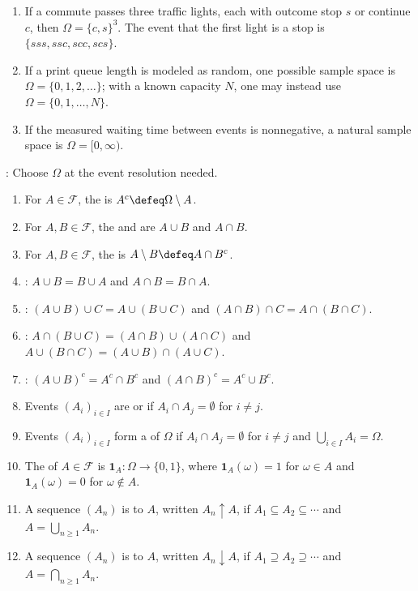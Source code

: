 \begin{example} \label{ex:introductory-sample-spaces-and-events} 
\begin{enumerate}[label=(\roman*)]
\setlength{\itemsep}{0pt}
\item If a commute passes three traffic lights, each with outcome stop $s$ or continue $c$, then $\Omega=\{c,s\}^3$. The event that the first light is a stop is $\{sss,ssc,scc,scs\}$.
\item If a print queue length is modeled as random, one possible sample space is $\Omega=\{0,1,2,\ldots\}$; with a known capacity $N$, one may instead use $\Omega=\{0,1,\ldots,N\}$.
\item If the measured waiting time between events is nonnegative, a natural sample space is $\Omega=[0,\infty)$.
\end{enumerate}
: Choose $\Omega$ at the event resolution needed.
\end{example}

\begin{definition} \label{def:event-algebra-indicators-and-monotone-events} 
\begin{enumerate}[label=(\roman*)]
\setlength{\itemsep}{0pt}
\item For $A\in\mathcal{F}$, the  is $A^c\defeq\Omega\setminus A$.
\item For $A,B\in\mathcal{F}$, the  and  are $A\cup B$ and $A\cap B$.
\item For $A,B\in\mathcal{F}$, the  is $A\setminus B\defeq A\cap B^c$.
\item {}: $A\cup B=B\cup A$ and $A\cap B=B\cap A$.
\item {}: $(A\cup B)\cup C=A\cup(B\cup C)$ and $(A\cap B)\cap C=A\cap(B\cap C)$.
\item {}: $A\cap(B\cup C)=(A\cap B)\cup(A\cap C)$ and $A\cup(B\cap C)=(A\cup B)\cap(A\cup C)$.
\item {}: $(A\cup B)^c=A^c\cap B^c$ and $(A\cap B)^c=A^c\cup B^c$.
\item Events $(A_i)_{i\in I}$ are  or  if $A_i\cap A_j=\emptyset$ for $i\neq j$.
\item Events $(A_i)_{i\in I}$ form a  of $\Omega$ if $A_i\cap A_j=\emptyset$ for $i\neq j$ and $\bigcup\limits_{i\in I}A_i=\Omega$.
\item The  of $A\in\mathcal{F}$ is $\mathbf{1}_A:\Omega\to\{0,1\}$, where $\mathbf{1}_A(\omega)=1$ for $\omega\in A$ and $\mathbf{1}_A(\omega)=0$ for $\omega\notin A$.
\item A sequence $(A_n)$ is  to $A$, written $A_n\uparrow A$, if $A_1\subseteq A_2\subseteq\cdots$ and $A=\bigcup\limits_{n\geq1}A_n$.
\item A sequence $(A_n)$ is  to $A$, written $A_n\downarrow A$, if $A_1\supseteq A_2\supseteq\cdots$ and $A=\bigcap\limits_{n\geq1}A_n$.
\end{enumerate}
\end{definition}


